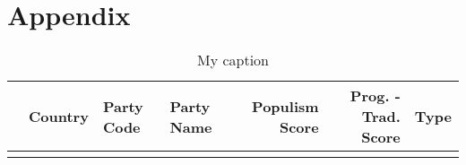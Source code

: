 \newpage
\section{Appendix}

\setcounter{table}{0}
\renewcommand{\thetable}{A\arabic{table}}

\setcounter{figure}{0}
\renewcommand{\thefigure}{A\arabic{figure}}

\small

\begin{longtable}[c]{@{\extracolsep{\fill}}rlllrrl}
		\caption{My caption}
		\label{my-label}\\
		\hline
		& Country & Party Code & Party Name & Populism Score & Prog. - Trad. Score & Type \\ \hline
		\endhead
		\hline
		\endfoot
		\endlastfoot
		

\end{longtable}
